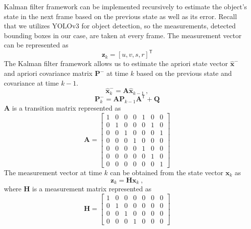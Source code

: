 Kalman filter framework can be implemented recursively to estimate the object's state in the next frame based on the previous state as well as its error. Recall that we utilizes YOLOv3 for object detection, so the measurements, detected bounding boxes in our case, are taken at every frame. The measurement vector can be represented as
\begin{equation}
\mathbf{z}_{k} = [u, v, s, r]^\mathsf{T}
\label{eqn:measurement_vector}
\end{equation}
The Kalman filter framework allows us to estimate the apriori state vector $\mathbf{\hat{x}}^-$ and apriori covariance matrix $\mathbf{P}^-$ at time $k$ based on the previous state and covariance at time $k-1$.
\begin{equation}
\mathbf{\hat{x}}_{k}^{-} = \mathbf{A} \mathbf{\hat{x}}_{k-1} ~ ,
\label{eqn:state_apriori_update}
\end{equation}
\begin{equation}
\mathbf{P}_{k}^- = \mathbf{A}\mathbf{P}_{k-1}\mathbf{A}^\mathsf{T}+\mathbf{Q}
\label{eqn:error_apriori_update}
\end{equation}
$\mathbf{A}$ is a transition matrix represented as
\begin{equation}
\mathbf{A} = \left[ \begin{matrix} 1 & 0 & 0 & 0 & 1 & 0 & 0 \\ 0 & 1 & 0 & 0 & 0 & 1 & 0 \\ 0 & 0 & 1 & 0 & 0 & 0 & 1 \\ 0 & 0 & 0 & 1 & 0 & 0 & 0 \\ 0 & 0 & 0 & 0 & 1 & 0 & 0 \\ 0 & 0 & 0 & 0 & 0 & 1 & 0 \\ 0 & 0 & 0 & 0 & 0 & 0 & 1 \end{matrix} \right]
\label{eqn:transition_matrix}
\end{equation}
The measurement vector at time $k$ can be obtained from the state vector $\mathbf{x}_k$ as
\begin{equation}
\mathbf{z}_{k} = \mathbf{H} \mathbf{x}_{k} ~ ,
\label{eqn:measurement_eqn}
\end{equation}
where $\mathbf{H}$ is a measurement matrix represented as
\begin{equation}
\mathbf{H} = \left[ \begin{matrix} 1 & 0 & 0 & 0 & 0 & 0 & 0 \\ 0 & 1 & 0 & 0 & 0 & 0 & 0 \\ 0 & 0 & 1 & 0 & 0 & 0 & 0 \\ 0 & 0 & 0 & 1 & 0 & 0 & 0 \end{matrix} \right]
\label{eqn:measurement_matrix}
\end{equation}
